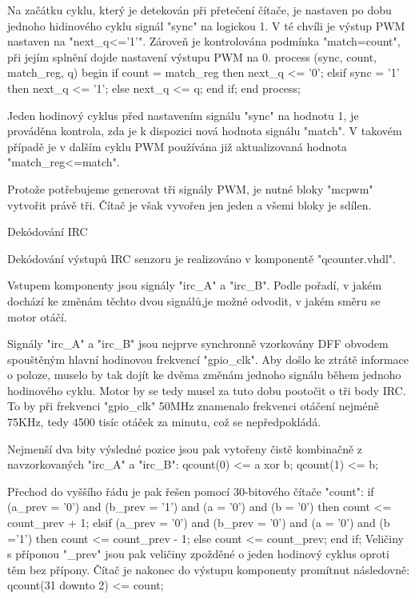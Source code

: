 Na začátku cyklu, který je detekován při přetečení čítače, je nastaven po dobu jednoho hidinového cyklu signál "sync" na logickou 1. V té chvíli je výstup PWM nastaven na "next_q<='1'". Zároveň je kontrolována podmínka "match=count", při jejím splnění dojde nastavení výstupu PWM na 0.
\begtt
process (sync, count, match_reg, q)  
begin
  if count = match_reg then 
    next_q <= '0';
  elsif sync = '1' then 			
    next_q <= '1';
  else
    next_q <= q;
  end if;
end process;\endtt
  
   Jeden hodinový cyklus před nastavením signálu "sync" na hodnotu 1, je prováděna kontrola, zda je k dispozici nová hodnota signálu "match". V takovém případě je v dalším cyklu PWM používána již aktualizovaná hodnota "match_reg<=match". 

Protože potřebujeme generovat tři signály PWM, je nutné bloky "mcpwm" vytvořit právě tři. Čítač je však vyvořen jen jeden a všemi bloky je sdílen.  


\sec Dekódování IRC

Dekódování výstupů IRC senzoru je realizováno v komponentě "qcounter.vhdl". 

Vstupem komponenty jsou signály "irc_A" a "irc_B". Podle pořadí, v jakém dochází ke změnám těchto dvou signálů,je možné odvodit, v jakém směru se motor otáčí.

Signály "irc_A" a "irc_B" jsou nejprve synchronně vzorkovány DFF obvodem spouštěným hlavní hodinovou frekvencí "gpio_clk". Aby došlo ke ztrátě informace o poloze, muselo by tak dojít ke dvěma změnám jednoho signálu během jednoho hodinového cyklu. Motor by se tedy musel za tuto dobu pootočit o tři body IRC. To by při frekvenci "gpio_clk" 50MHz znamenalo frekvenci otáčení  nejméně 75KHz, tedy 4500 tisíc otáček za minutu, což se nepředpokládá.

Nejmenší dva bity výsledné pozice jsou pak vytořeny čistě kombinačně z navzorkovaných "irc_A" a "irc_B":
  \begtt
	qcount(0) <= a xor b;
	qcount(1) <= b;\endtt
 
Přechod do vyššího řádu je pak řešen pomocí 30-bitového čítače "count":
\begtt
	if (a_prev = '0') and (b_prev = '1') and (a = '0') and (b = '0') then 
		  count <= count_prev + 1;
	elsif (a_prev = '0') and (b_prev = '0') and (a = '0') and (b ='1') then 
		  count <= count_prev - 1;
	else
		  count <= count_prev;
	end if;\endtt
Veličiny s příponou "_prev" jsou pak veličiny zpožděné o jeden hodinový cyklus oproti těm bez přípony. Čítač je nakonec do výstupu komponenty promítnut následovně:
\begtt
  qcount(31 downto 2) <= count;\endtt


